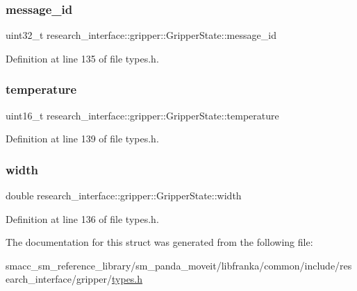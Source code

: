\subsubsection{\texorpdfstring{message\+\_\+id}{message\_id}}
{\footnotesize\ttfamily uint32\+\_\+t research\+\_\+interface\+::gripper\+::\+Gripper\+State\+::message\+\_\+id}



Definition at line 135 of file types.\+h.

\mbox{\label{structresearch__interface_1_1gripper_1_1GripperState_ab96bb42ece0247d8c0111198f6fbe4d4}} 
\subsubsection{\texorpdfstring{temperature}{temperature}}
{\footnotesize\ttfamily uint16\+\_\+t research\+\_\+interface\+::gripper\+::\+Gripper\+State\+::temperature}



Definition at line 139 of file types.\+h.

\mbox{\label{structresearch__interface_1_1gripper_1_1GripperState_a7643e3d629b1add9c2ac13342f11da6d}} 
\subsubsection{\texorpdfstring{width}{width}}
{\footnotesize\ttfamily double research\+\_\+interface\+::gripper\+::\+Gripper\+State\+::width}



Definition at line 136 of file types.\+h.



The documentation for this struct was generated from the following file\+:\begin{DoxyCompactItemize}
\item 
smacc\+\_\+sm\+\_\+reference\+\_\+library/sm\+\_\+panda\+\_\+moveit/libfranka/common/include/research\+\_\+interface/gripper/\hyperlink{types_8h}{types.\+h}\end{DoxyCompactItemize}
